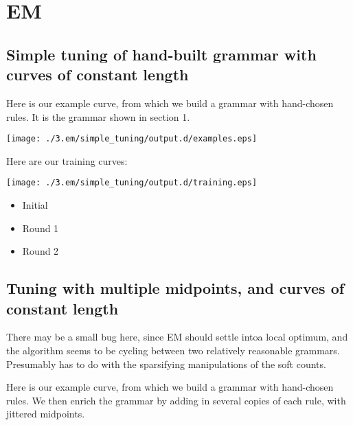 \documentclass{book}
\begin{document}
\section{EM}
\label{sec-3_4}
\subsection{Simple tuning of hand-built grammar with curves of constant length}
\label{sec-3_4_1}

Here is our example curve, from which we build a grammar with
hand-chosen rules. It is the grammar shown in section 1.

\texttt{[image: ./3.em/simple\_tuning/output.d/examples.eps]}

Here are our training curves:

\texttt{[image: ./3.em/simple\_tuning/output.d/training.eps]}
\begin{itemize}

\item Initial\\
\label{sec-3_4_1_1}%


\item Round 1\\
\label{sec-3_4_1_2}%


\item Round 2\\
\label{sec-3_4_1_3}%


\end{itemize} %
\subsection{Tuning with multiple midpoints, and curves of constant length}
\label{sec-3_4_2}


There may be a small bug here, since EM should settle intoa local
optimum, and the algorithm seems to be cycling between two relatively
reasonable grammars. Presumably has to do with the sparsifying
manipulations of the soft counts.

Here is our example curve, from which we build a grammar with
hand-chosen rules. We then enrich the grammar by adding in several
copies of each rule, with jittered midpoints.
\end{document}
